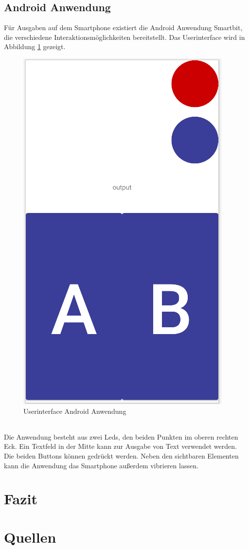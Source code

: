 \documentclass[11pt,a4paper]{report}
\begin{document}
\section{Android Anwendung}\label{sec:androidApp}
Für Ausgaben auf dem Smartphone existiert die Android Anwendung Smartbit, die verschiedene Interaktionsmöglichkeiten bereitstellt.
Das Userinterface wird in Abbildung \ref{fig:androidUI} gezeigt.
\begin{figure}[htbp]
  \centering
  \includegraphics[width=.6\textwidth]{images/android_app_ui}
  \caption{Userinterface Android Anwendung}
  \label{fig:androidUI}
\end{figure}
\\
Die Anwendung besteht aus zwei Leds, den beiden Punkten im oberen rechten Eck.
Ein Textfeld in der Mitte kann zur Ausgabe von Text verwendet werden.
Die beiden Buttons können gedrückt werden.
Neben den sichtbaren Elementen kann die Anwendung das Smartphone außerdem vibrieren lassen.



\chapter{Fazit}\label{chap:fazit}
\blindtext

\chapter{Quellen}\label{chap:source}
\end{document}
